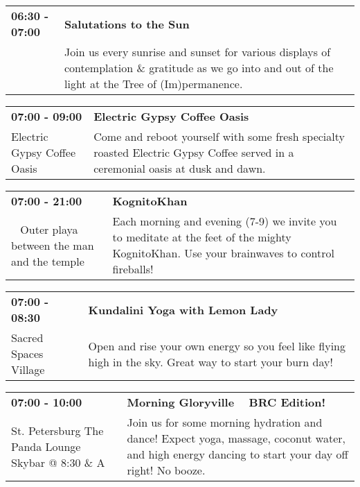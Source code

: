 \begin{tabular}{ p{1in} p{2.2in} }
    \textbf{06:30 - 07:00} & \textbf{Salutations to the Sun} \\
    ~ \newline  & Join us every sunrise and sunset for various displays of contemplation \& gratitude as we go into and out of the light at the Tree of (Im)permanence. \\
    \hline 
\end{tabular}
    
\begin{tabular}{ p{1in} p{2.2in} }
    \textbf{07:00 - 09:00} & \textbf{Electric Gypsy Coffee Oasis} \\
    Electric Gypsy Coffee Oasis \newline  & Come and reboot yourself with some fresh specialty roasted Electric Gypsy Coffee served in a ceremonial oasis at dusk and dawn. \\
    \hline 
\end{tabular}
    
\begin{tabular}{ p{1in} p{2.2in} }
    \textbf{07:00 - 21:00} & \textbf{KognitoKhan} \\
    ~ \newline Outer playa between the man and the temple & Each morning and evening (7-9) we invite you to meditate at the feet of the mighty KognitoKhan. Use your brainwaves to control fireballs! \\
    \hline 
\end{tabular}
    
\begin{tabular}{ p{1in} p{2.2in} }
    \textbf{07:00 - 08:30} & \textbf{Kundalini Yoga with Lemon Lady} \\
    Sacred Spaces Village \newline  & Open and rise your own energy so you feel like flying high in the sky. Great way to start your burn day! \\
    \hline 
\end{tabular}
    
\begin{tabular}{ p{1in} p{2.2in} }
    \textbf{07:00 - 10:00} & \textbf{Morning Gloryville ~ BRC Edition!} \\
    St. Petersburg \newline The Panda Lounge Skybar @ 8:30 \& A & Join us for some morning hydration and dance!  Expect yoga, massage, coconut water, and high energy dancing to start your day off right! No booze. \\
    \hline 
\end{tabular}
    
